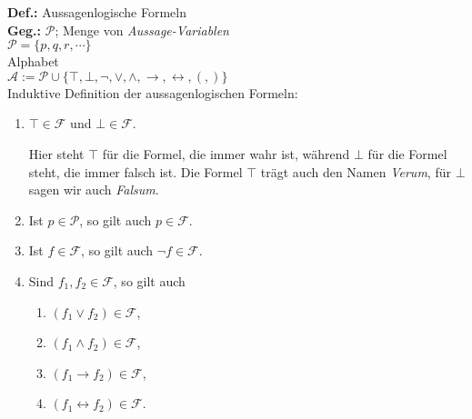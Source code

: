 \documentclass{article}
\newcommand{\verum}{\top}
\newcommand{\falsum}{\bot}
\begin{document}
\noindent
\textbf{Def.:} Aussagenlogische Formeln \\
\textbf{Geg.:} $\mathcal{P}$; Menge von  \emph{Aussage-Variablen} 
\\[0.3cm]
\hspace*{1.3cm} $\mathcal{P} = \{ p, q, r, \cdots \}$
\\[0.3cm]
\hspace*{1.3cm} Alphabet
\\[0.3cm]
\hspace*{1.3cm} $\mathcal{A} := \mathcal{P} \cup \bigl\{ \verum, \falsum, \neg, \vee, \wedge,
                   \rightarrow, \leftrightarrow, (, ) \bigr\}$
\\[0.3cm]
Induktive Definition der aussagenlogischen Formeln:
\begin{enumerate}
\item $\verum \in \mathcal{F}$ und $\mathtt{\falsum} \in \mathcal{F}$.

      Hier steht $\verum$ f\"{u}r die Formel, die immer wahr ist, w\"{a}hrend $\falsum$ f\"{u}r die 
      Formel steht, die immer falsch ist.  Die Formel $\verum$ tr\"{a}gt auch den Namen \emph{Verum},
      f\"{u}r $\falsum$ sagen wir auch \emph{Falsum}.
\item Ist $p \in \mathcal{P}$, so gilt auch $p \in \mathcal{F}$.
\item Ist $f \in \mathcal{F}$, so gilt auch $\neg f \in \mathcal{F}$.
\item Sind $f_1, f_2 \in \mathcal{F}$, so gilt auch
      \begin{enumerate}
      \item  $(f_1 \vee f_2) \in \mathcal{F}$,
      \item  $(f_1 \wedge f_2) \in \mathcal{F}$,
      \item  $(f_1 \rightarrow f_2) \in \mathcal{F}$,
      \item  $(f_1 \leftrightarrow f_2) \in \mathcal{F}$.
      \end{enumerate}
\end{enumerate}
\end{document}
